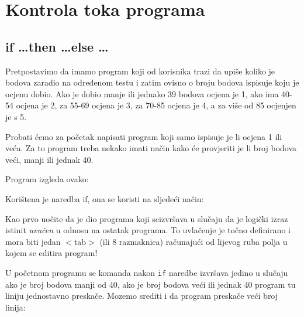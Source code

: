 \chapter{Kontrola toka programa}

\section{if \dots then \dots else \dots}

Pretpostavimo da imamo program koji od korisnika trazi da upiše
koliko je bodova zaradio na određenom testu i zatim ovisno o broju
bodova ispisuje koju je ocjenu dobio. Ako je dobio manje ili jednako
39 bodova ocjena je 1, ako ima 40-54 ocjena je 2, za 55-69 ocjena
je 3, za 70-85 ocjena je 4, a za više od 85 ocjenjen je s 5.

Probati ćemo za početak napisati program koji samo ispisuje je
li ocjena 1 ili veća. Za to program treba nekako imati način kako
će provjeriti je li broj bodova veći, manji ili jednak 40.

Program izgleda ovako:


Korištena je naredba if, ona se koristi na sljedeći način:


Kao prvo uočite da je dio programa koji seizvršava u slučaju da
je logički izraz istinit \emph{uvučen} u odnosu na ostatak
programa. To uvlačenje je točno definirano i mora biti jedan
$<$tab$>$ (ili 8 razmaknica) računajući od lijevog ruba polja u kojem se
editira program!

U početnom programu se komanda nakon \verb"if" naredbe izvršava
jedino u slučaju ako je broj bodova manji od 40, ako je broj bodova
veći ili jednak 40 program tu liniju jednostavno preskače. Mozemo
srediti i da program preskače veći broj linija:


